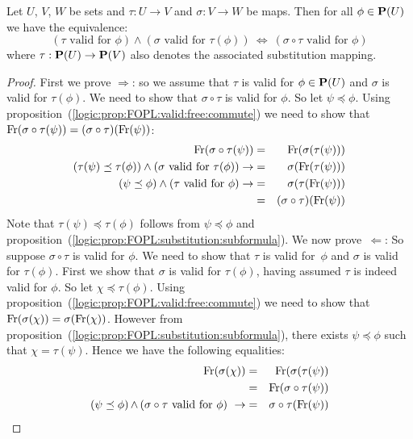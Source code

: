 \begin{prop}\label{logic:prop:FOPL:valid:composition}
Let $U$, $V$, $W$ be sets and $\tau:U\to V$ and $\sigma:V\to W$ be
maps. Then for all $\phi\in{\bf P}(U)$ we have the equivalence:
\[
    (\mbox{$\tau$ valid for $\phi$})\land(\mbox{$\sigma$ valid for
    $\tau(\phi)$})\ \Leftrightarrow\ (\mbox{$\sigma\circ\tau$ valid for
    $\phi$})
\]
where $\tau:{\bf P}(U)\to{\bf P}(V)$ also denotes the associated
substitution mapping.
\end{prop}
\begin{proof}
First we prove $\Rightarrow$: so we assume that $\tau$ is valid for
$\phi\in{\bf P}(U)$ and $\sigma$ is valid for $\tau(\phi)$. We need
to show that $\sigma\circ\tau$ is valid for $\phi$. So let
$\psi\preceq\phi$. Using
proposition~(\ref{logic:prop:FOPL:valid:free:commute}) we need to
show that $\mbox{\rm Fr}(\sigma\circ\tau(\psi))
=(\sigma\circ\tau)(\mbox{\rm Fr}(\psi))$:
    \begin{eqnarray*}
    \mbox{\rm Fr}(\sigma\circ\tau(\psi))&=&\mbox{\rm Fr}(\sigma(\tau(\psi)))\\
   (\tau(\psi)\preceq\tau(\phi))\land(\mbox{$\sigma$ valid for $\tau(\phi)$})\rightarrow
   &=&\sigma(\mbox{\rm Fr}(\tau(\psi)))\\
   (\psi\preceq\phi)\land(\mbox{$\tau$ valid for $\phi$})
   \rightarrow&=&\sigma(\tau(\mbox{\rm Fr}(\psi)))\\
   &=&(\sigma\circ\tau)(\mbox{\rm Fr}(\psi))
    \end{eqnarray*}
Note that $\tau(\psi)\preceq\tau(\phi)$ follows from
$\psi\preceq\phi$ and
proposition~(\ref{logic:prop:FOPL:substitution:subformula}). We now
prove~$\Leftarrow$: So suppose $\sigma\circ\tau$ is valid for
$\phi$. We need to show that $\tau$ is valid for~$\phi$ and $\sigma$
is valid for $\tau(\phi)$. First we show that $\sigma$ is valid for
$\tau(\phi)$, having assumed $\tau$ is indeed valid for $\phi$. So
let $\chi\preceq\tau(\phi)$. Using
proposition~(\ref{logic:prop:FOPL:valid:free:commute}) we need to
show that $\mbox{\rm Fr}(\sigma(\chi))=\sigma(\mbox{\rm Fr}(\chi))$. However from
proposition~(\ref{logic:prop:FOPL:substitution:subformula}), there
exists $\psi\preceq\phi$ such that $\chi=\tau(\psi)$. Hence we have
the following equalities:
    \begin{eqnarray*}
    \free(\sigma(\chi))&=&\free(\sigma(\tau(\psi))\\
    &=&\free(\sigma\circ\tau(\psi))\\
    \mbox{($\psi\preceq\phi$)$\,\land\,$($\sigma\circ\tau$ valid for $\phi$)}\ \rightarrow
    &=&\sigma\circ\tau(\free(\psi))\\

\end{eqnarray*}
\end{proof}
